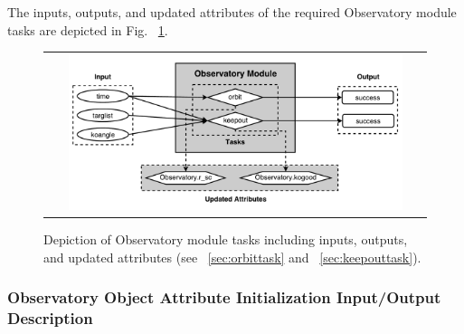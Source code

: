 \documentclass[cleanfoot]{asme2ej}
\begin{document}
The inputs, outputs, and updated attributes of the required Observatory module tasks are depicted in Fig. ~\ref{fig:observatorymodule}.

\begin{figure}[ht]
    \begin{center}
        \begin{tabular}{c}
             \includegraphics[width=0.9\textwidth]{observatory3}
        \end{tabular}
    \end{center}
    \caption{\label{fig:observatorymodule} Depiction of Observatory module tasks including inputs, outputs, and updated attributes (see ~\ref{sec:orbittask} and ~\ref{sec:keepouttask}).}
\end{figure}

\label{sec:observatory}
\subsubsection{Observatory Object Attribute Initialization Input/Output Description}
\end{document}
